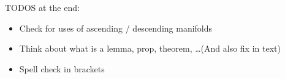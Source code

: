 TODOS at the end:
\begin{itemize}
    \item Check for uses of ascending / descending manifolds
    \item Think about what is a lemma, prop, theorem, \ldots (And also fix in text)
    \item Spell check in brackets
\end{itemize}
